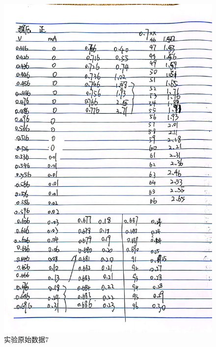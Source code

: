 \documentclass{ctexart}
\begin{document}
\begin{figure}[H]
  \centering
  \includegraphics[width=1\textwidth,height=0.8\textheight]{wenyazhengxiang1.jpg}
  \caption{实验原始数据7}\label{wenyazhengxiang1}
\end{figure}
\newpage
\end{document}
